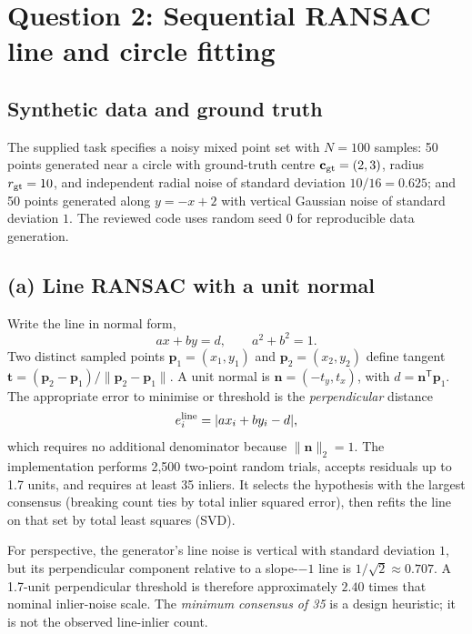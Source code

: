 \documentclass[11pt,a4paper]{article}
\begin{document}
\section{Question 2: Sequential RANSAC line and circle fitting}
\subsection{Synthetic data and ground truth}
The supplied task specifies a noisy mixed point set with $N=100$ samples: 50 points generated near a circle with ground-truth centre $\mathbf{c}_{\rm gt}=(2,3)$, radius $r_{\rm gt}=10$, and independent radial noise of standard deviation $10/16=0.625$; and 50 points generated along $y=-x+2$ with vertical Gaussian noise of standard deviation $1$. The reviewed code uses random seed 0 for reproducible data generation.

\subsection{(a) Line RANSAC with a unit normal}
Write the line in normal form,
\begin{equation}
  a x+b y=d, \qquad a^2+b^2=1.
\end{equation}
Two distinct sampled points $\mathbf{p}_1=(x_1,y_1)$ and $\mathbf{p}_2=(x_2,y_2)$ define tangent $\mathbf{t}=(\mathbf{p}_2-\mathbf{p}_1)/\|\mathbf{p}_2-\mathbf{p}_1\|$. A unit normal is $\mathbf{n}=(-t_y,t_x)$, with $d=\mathbf{n}^{\mathsf T}\mathbf{p}_1$. The appropriate error to minimise or threshold is the \emph{perpendicular} distance
\begin{equation}
  e_i^{\rm line}=|a x_i+b y_i-d|,
\end{equation}
which requires no additional denominator because $\|\mathbf{n}\|_2=1$. The implementation performs 2,500 two-point random trials, accepts residuals up to 1.7 units, and requires at least 35 inliers. It selects the hypothesis with the largest consensus (breaking count ties by total inlier squared error), then refits the line on that set by total least squares (SVD).

For perspective, the generator's line noise is vertical with standard deviation $1$, but its perpendicular component relative to a slope-$-1$ line is $1/\sqrt{2}\approx0.707$. A 1.7-unit perpendicular threshold is therefore approximately $2.40$ times that nominal inlier-noise scale. The \emph{minimum consensus of 35} is a design heuristic; it is not the observed line-inlier count.
\end{document}
